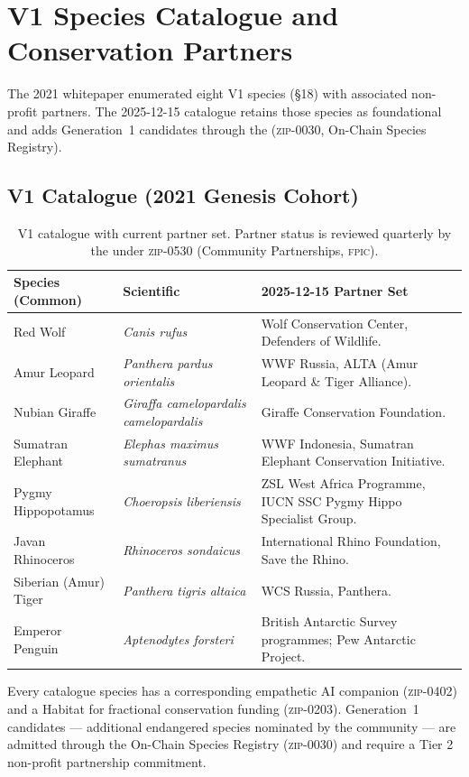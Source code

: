 \section{V1 Species Catalogue and Conservation Partners}
\label{sec:catalogue}

The 2021 whitepaper enumerated eight V1 species (\S18) with associated
non-profit partners. The 2025-12-15 catalogue retains those species as
foundational and adds Generation~1 candidates through the \DAO{} (\textsc{zip-0030},
On-Chain Species Registry).

\subsection{V1 Catalogue (2021 Genesis Cohort)}

\begin{table}[h]
\centering
\small
\begin{tabular}{p{4cm}p{4cm}p{6cm}}
\toprule
\textbf{Species (Common)} & \textbf{Scientific} & \textbf{2025-12-15 Partner Set} \\
\midrule
Red Wolf & \emph{Canis rufus} & Wolf Conservation Center, Defenders of Wildlife. \\
Amur Leopard & \emph{Panthera pardus orientalis} & WWF Russia, ALTA (Amur Leopard \& Tiger Alliance). \\
Nubian Giraffe & \emph{Giraffa camelopardalis camelopardalis} & Giraffe Conservation Foundation. \\
Sumatran Elephant & \emph{Elephas maximus sumatranus} & WWF Indonesia, Sumatran Elephant Conservation Initiative. \\
Pygmy Hippopotamus & \emph{Choeropsis liberiensis} & ZSL West Africa Programme, IUCN SSC Pygmy Hippo Specialist Group. \\
Javan Rhinoceros & \emph{Rhinoceros sondaicus} & International Rhino Foundation, Save the Rhino. \\
Siberian (Amur) Tiger & \emph{Panthera tigris altaica} & WCS Russia, Panthera. \\
Emperor Penguin & \emph{Aptenodytes forsteri} & British Antarctic Survey programmes; Pew Antarctic Project. \\
\bottomrule
\end{tabular}
\caption{V1 \NFT{} catalogue with current partner set. Partner status
is reviewed quarterly by the \DAO{} under \textsc{zip-0530}
(Community Partnerships, \textsc{fpic}).}
\end{table}

Every catalogue species has a corresponding empathetic AI companion
(\textsc{zip-0402}) and a Habitat \NFT{} for fractional conservation
funding (\textsc{zip-0203}). Generation~1 candidates --- additional
endangered species nominated by the community --- are admitted through
the On-Chain Species Registry (\textsc{zip-0030}) and require a Tier 2
non-profit partnership commitment.

